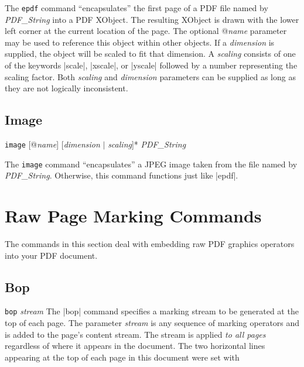 {\description
The {\tt epdf} command ``encapsulates'' the first page of a PDF
file named by {\it PDF\_String}
into a PDF XObject.  The resulting XObject is drawn
with the lower left corner at the current location of the page.
The optional @{\it name} parameter may be used
to reference this object within other objects.  If a
{\it dimension} is supplied, the object will be scaled to fit
that dimension.  A {\it scaling} consists of one of the keywords
|scale|, |xscale|, or |yscale| followed by a number representing
the scaling factor.  Both {\it scaling} and {\it dimension}
parameters can be supplied as long as they are not logically
inconsistent.
\example
\begintt
{}
\endtt

\subsection{Image}
\syntax
{\tt image} [@{\it name}] [{\it dimension} $\vert$ {\it scaling}]*  {\it PDF\_String}

\description
The {\tt image} command ``encapsulates'' a JPEG image
taken from the file named by {\it PDF\_String}.
Otherwise, this command functions just like |epdf|.

\section{Raw Page Marking Commands}
The commands in this section deal with embedding
raw PDF graphics operators into your PDF document.

\subsection{Bop}
\syntax
{\tt bop} {\it stream}
\description
The |bop| command specifies a marking
stream to be generated at the top of each page.
The parameter {\it stream} is any sequence
of marking operators and is added to the page's content stream.  
The stream is applied {\it to all pages} regardless
of where it appears in the document.
\example  The two horizontal lines appearing
at the top of each page in this document
were set with
\begintt
{}
\endtt
{}

}
